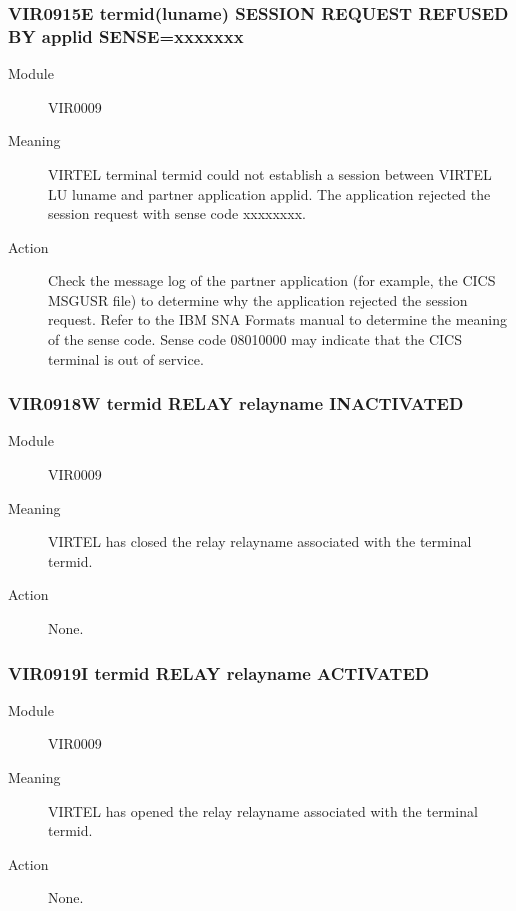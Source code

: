 \documentclass[letterpaper,10pt,english]{sphinxmanual}
\begin{document}
\subsubsection{VIR0915E termid(luname) SESSION REQUEST REFUSED BY applid SENSE=xxxxxxx}
\label{\detokenize{messages:vir0915e-termid-luname-session-request-refused-by-applid-sense-xxxxxxx}}\begin{description}
\item[{Module}] \leavevmode
VIR0009

\item[{Meaning}] \leavevmode
VIRTEL terminal termid could not establish a session between VIRTEL LU luname and partner application applid. The application rejected the session request with sense code xxxxxxxx.

\item[{Action}] \leavevmode
Check the message log of the partner application (for example, the CICS MSGUSR file) to determine why the application rejected the session request. Refer to the IBM SNA Formats manual to determine the meaning of the sense code. Sense code 08010000 may indicate that the CICS terminal is out of service.

\end{description}


\subsubsection{VIR0918W termid RELAY relayname INACTIVATED}
\label{\detokenize{messages:vir0918w-termid-relay-relayname-inactivated}}\begin{description}
\item[{Module}] \leavevmode
VIR0009

\item[{Meaning}] \leavevmode
VIRTEL has closed the relay relayname associated with the terminal termid.

\item[{Action}] \leavevmode
None.

\end{description}


\subsubsection{VIR0919I termid RELAY relayname ACTIVATED}
\label{\detokenize{messages:vir0919i-termid-relay-relayname-activated}}\begin{description}
\item[{Module}] \leavevmode
VIR0009

\item[{Meaning}] \leavevmode
VIRTEL has opened the relay relayname associated with the terminal termid.

\item[{Action}] \leavevmode
None.

\end{description}
\end{document}
